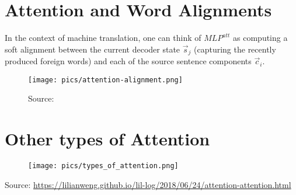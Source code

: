 \section{Attention and Word Alignments}
In the context of machine translation, one can think of $MLP^{att}$ as computing a soft alignment between the current decoder state $\vec{s}_j$ (capturing the recently produced foreign words) and each of the source sentence components $\vec{c}_i$.


         \begin{figure}[h]
        	\texttt{[image: pics/attention-alignment.png]}
        	\caption{Source: \cite{cho2015describing}}
        \end{figure}  



\section{Other types of Attention}
       \begin{figure}[h]
        	\texttt{[image: pics/types\_of\_attention.png]}
        \end{figure}  
        Source: \url{https://lilianweng.github.io/lil-log/2018/06/24/attention-attention.html}

